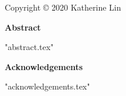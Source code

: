 \documentclass[11pt,letterpaper]{report}
\begin{document}

\newpage
\thispagestyle{empty}
\begin{center}
    Copyright \copyright{} 2020 Katherine Lin
\end{center}



\clearpage
\iftoggle{pretty}
{\singlespacing}
{\doublespacing}
\begin{center}
    \vspace*{0.3in}
    \textbf{Abstract}
\end{center}
 {"abstract.tex"}
\clearpage


\clearpage
{}
\begin{center}
    \vspace*{0.3in}
    \textbf{Acknowledgements}
\end{center}

 {"acknowledgements.tex"}

\end{document}
